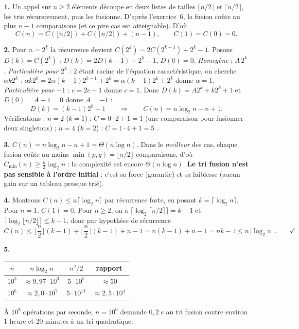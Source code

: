 \documentclass[11pt,a4paper]{article}
\begin{document}
\reponse
\textbf{1.} Un appel sur $n\ge2$ éléments découpe en deux listes de tailles
$\lfloor n/2\rfloor$ et $\lceil n/2\rceil$, les trie récursivement, puis les fusionne.
D'après l'exercice~6, la fusion coûte au plus $n-1$ comparaisons (et ce pire cas est
atteignable). D'où
\[
  C(n)=C(\lfloor n/2\rfloor)+C(\lceil n/2\rceil)+(n-1),\qquad C(1)=C(0)=0.
\]

\textbf{2.} Pour $n=2^{k}$ la récurrence devient $C(2^{k})=2C(2^{k-1})+2^{k}-1$.
Posons $D(k)=C(2^{k})$ : $D(k)=2D(k-1)+2^{k}-1$, $D(0)=0$.
\emph{Homogène} : $A\,2^{k}$.
\emph{Particulière pour $2^{k}$} : $2$ étant racine de l'équation caractéristique, on
cherche $\alpha k2^{k}$ :
$\alpha k 2^{k}=2\alpha(k-1)2^{k-1}+2^{k}=\alpha(k-1)2^{k}+2^{k}$ donne $\alpha=1$.
\emph{Particulière pour $-1$} : $c=2c-1$ donne $c=1$.
Donc $D(k)=A2^{k}+k2^{k}+1$ et $D(0)=A+1=0$ donne $A=-1$ :
\[
  D(k)=(k-1)2^{k}+1 \qquad\Longrightarrow\qquad
  \boxed{C(n)=n\log_2 n - n + 1}.
\]
Vérifications : $n=2$ ($k=1$) : $C=0\cdot2+1=1$ (une comparaison pour fusionner deux
singletons) \checkmark ; $n=4$ ($k=2$) : $C=1\cdot4+1=5$ \checkmark.

\textbf{3.} $C(n)=n\log_2 n-n+1=\Theta(n\log n)$.
Dans le \emph{meilleur} des cas, chaque fusion coûte au moins $\min(p,q)=\lfloor n/2\rfloor$
comparaisons, d'où $C_{\min}(n)\ge \frac n2\log_2 n$ : la complexité est encore
$\Theta(n\log n)$. \textbf{Le tri fusion n'est pas sensible à l'ordre initial} : c'est
sa force (garantie) et sa faiblesse (aucun gain sur un tableau presque trié).

\textbf{4.} Montrons $C(n)\le n\lceil\log_2 n\rceil$ par récurrence forte, en posant
$k=\lceil\log_2 n\rceil$. Pour $n=1$, $C(1)=0$. Pour $n\ge2$, on a
$\lceil\log_2\lceil n/2\rceil\rceil = k-1$ et $\lceil\log_2\lfloor n/2\rfloor\rceil\le k-1$,
donc par hypothèse de récurrence
\[
  C(n)\le \Big\lfloor\frac n2\Big\rfloor (k-1)+\Big\lceil\frac n2\Big\rceil (k-1)+n-1
       = n(k-1)+n-1 = nk-1 \le n\lceil\log_2 n\rceil . \qquad\checkmark
\]

\textbf{5.}
\begin{center}\small
\begin{tabular}{|c|c|c|c|}
\hline
$n$ & $n\log_2 n$ & $n^{2}/2$ & rapport \\\hline
$10^{3}$ & $\approx 9{,}97\cdot10^{3}$ & $5\cdot10^{5}$ & $\approx 50$ \\\hline
$10^{6}$ & $\approx 2{,}0\cdot10^{7}$ & $5\cdot10^{11}$ & $\approx 2{,}5\cdot10^{4}$ \\\hline
\end{tabular}
\end{center}
À $10^{8}$ opérations par seconde, $n=10^{6}$ demande $0{,}2$ s au tri fusion contre
environ $1$ heure et $20$ minutes à un tri quadratique.
\end{document}
